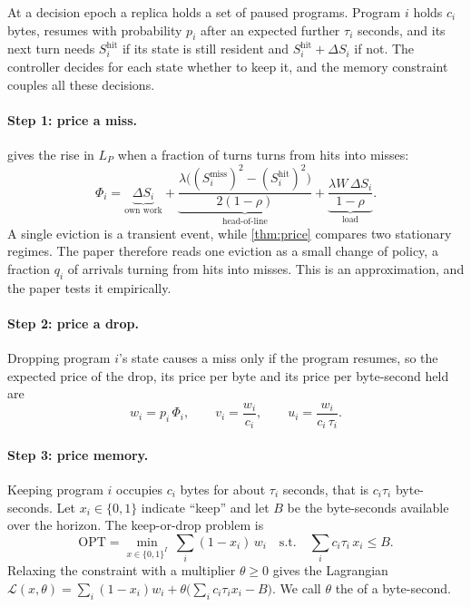 At a decision epoch a replica holds a set of paused programs. Program
$i$ holds $c_i$ bytes, resumes with probability $p_i$ after an expected
further $\tau_i$ seconds, and its next turn needs $S_i^{\mathrm{hit}}$ if
its state is still resident and $S_i^{\mathrm{hit}}+\Delta S_i$ if not. The
controller decides for each state whether to keep it, and the memory
constraint couples all these decisions.

\paragraph{Step 1: price a miss.}  gives the rise in $L_P$
when a fraction of turns turns from hits into misses:
\[
  \Phi_i=\underbrace{\Delta S_i}_{\text{own work}}
  +\underbrace{\frac{\lambda\bigl((S_i^{\mathrm{miss}})^2-(S_i^{\mathrm{hit}})^2\bigr)}{2(1-\rho)}}_{\text{head-of-line}}
  +\underbrace{\frac{\lambda W\,\Delta S_i}{1-\rho}}_{\text{load}} .
\]
A single eviction is a transient event, while \cref{thm:price} compares two
stationary regimes. The paper therefore reads one eviction as a small
change of policy, a fraction $q_i$ of arrivals turning from hits into
misses. This is an approximation, and the paper tests it empirically.

\paragraph{Step 2: price a drop.} Dropping program $i$'s state causes a
miss only if the program resumes, so the expected price of the drop, its
price per byte and its price per byte-second held are
\begin{equation}\label{L5:eq:utility}
  w_i=p_i\,\Phi_i,\qquad v_i=\frac{w_i}{c_i},\qquad u_i=\frac{w_i}{c_i\,\tau_i}.
\end{equation}

\paragraph{Step 3: price memory.} Keeping program $i$ occupies $c_i$ bytes
for about $\tau_i$ seconds, that is $c_i\tau_i$ byte-seconds. Let
$x_i\in\{0,1\}$ indicate ``keep'' and let $B$ be the byte-seconds available
over the horizon. The keep-or-drop problem is
\begin{equation}\label{L5:eq:primal}
  \mathrm{OPT}=\min_{x\in\{0,1\}^I}\ \sum_i(1-x_i)\,w_i
  \quad\text{s.t.}\quad \sum_i c_i\tau_i\,x_i\le B .
\end{equation}
Relaxing the constraint with a multiplier $\theta\ge0$ gives the
Lagrangian
$\mathcal{L}(x,\theta)=\sum_i(1-x_i)w_i+\theta\bigl(\sum_ic_i\tau_ix_i-B\bigr)$.
We call $\theta$ the  of a byte-second.


